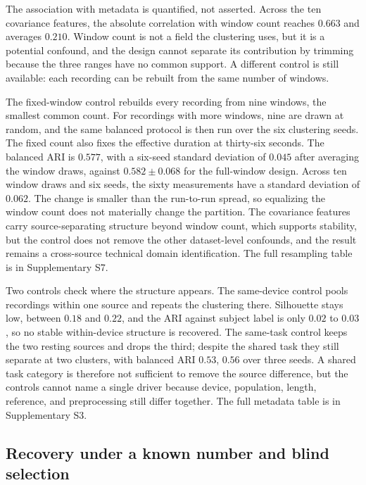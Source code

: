The association with metadata is quantified, not asserted. Across the
ten covariance features, the absolute correlation with window count
reaches \(0.663\) and averages \(0.210\). Window count is not a field
the clustering uses, but it is a potential confound, and the design
cannot separate its contribution by trimming because the three ranges
have no common support. A different control is still available: each
recording can be rebuilt from the same number of windows.

The fixed-window control rebuilds every recording from nine windows, the
smallest common count. For recordings with more windows, nine are drawn
at random, and the same balanced protocol is then run over the six
clustering seeds. The fixed count also fixes the effective duration at
thirty-six seconds. The balanced ARI is \(0.577\), with a six-seed
standard deviation of \(0.045\) after averaging the window draws,
against \(0.582\pm0.068\) for the full-window design. Across ten window
draws and six seeds, the sixty measurements have a standard deviation of
\(0.062\). The change is smaller than the run-to-run spread, so
equalizing the window count does not materially change the partition.
The covariance features carry source-separating structure beyond window
count, which supports stability, but the control does not remove the
other dataset-level confounds, and the result remains a cross-source
technical domain identification. The full resampling table is in
Supplementary S7.

Two controls check where the structure appears. The same-device control
pools recordings within one source and repeats the clustering there.
Silhouette stays low, between \(0.18\) and \(0.22\), and the ARI against
subject label is only \(0.02\) to \(0.03\), so no stable within-device
structure is recovered. The same-task control keeps the two resting
sources and drops the third; despite the shared task they still separate
at two clusters, with balanced ARI \(0.53\), \(0.56\) over three seeds.
A shared task category is therefore not sufficient to remove the source
difference, but the controls cannot name a single driver because device,
population, length, reference, and preprocessing still differ together.
The full metadata table is in Supplementary S3.

\subsection{Recovery under a known number and blind
selection}\label{recovery-under-a-known-number-and-blind-selection}


